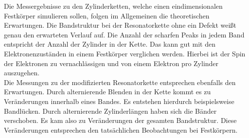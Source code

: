 Die Messergebnisse zu den Zylinderketten, welche einen eindimensionalen Festkörper simulieren sollen, folgen im Allgemeinen die theoretischen Erwartungen. Die Bandstruktur bei der Resonatorkette ohne ein Defekt weißt genau den erwarteten Verlauf auf. 
Die Anzahl der scharfen Peaks in jedem Band entspricht der Anzahl der Zylinder in der Kette. Das kann gut mit den Elektronenzuständen in einem Festkörper verglichen werden. Hierbei ist der Spin der Elektronen zu vernachlässigen und von einem Elektron pro Zylinder auszugehen. \\
Die Messungen zu der modifizierten Resonatorkette entsprechen ebenfalls den Erwartungen. Durch alternierende Blenden in der Kette kommt es zu Veränderungen innerhalb eines Bandes. Es entstehen hierdurch beispielsweise Bandlücken. 
Durch alternierende Zylinderlängen haben sich die Bänder verschoben. Es kam also zu Veränderungen der gesamten Bandstruktur. Diese Veränderungen entsprechen den tatsächlichen Beobachtungen bei Festkörpern. 